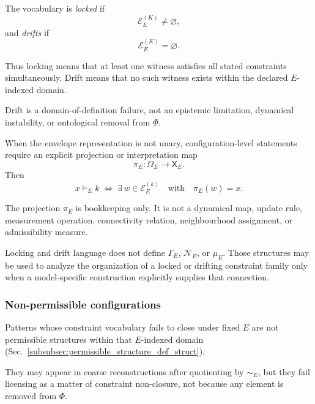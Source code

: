 \documentclass[aps,prx,onecolumn,11pt]{revtex4-2}
\theoremstyle{plain}
\theoremstyle{definition}
\theoremstyle{remark}
\begin{document}
The vocabulary is \emph{locked} if
\begin{equation}
\mathcal{E}^{(K)}_E
\neq
\varnothing,
\label{eq:locking_closure_nonempty}
\end{equation}
and \emph{drifts} if
\begin{equation}
\mathcal{E}^{(K)}_E
=
\varnothing.
\label{eq:drift_nonclosure_empty}
\end{equation}

Thus locking means that at least one witness satisfies all stated
constraints simultaneously. Drift means that no such witness exists
within the declared \(E\)-indexed domain.

Drift is a domain-of-definition failure, not an epistemic limitation,
dynamical instability, or ontological removal from \(\Phi\).

When the envelope representation is not unary, configuration-level
statements require an explicit projection or interpretation map
\[
\pi_E:\Omega_E\to\mathsf{X}_E.
\]
Then
\begin{equation}
x\models_E k
\;\Longleftrightarrow\;
\exists\,w\in\mathcal{E}^{(k)}_E
\quad
\text{with}
\quad
\pi_E(w)=x.
\label{eq:witness_projection_general_to_target}
\end{equation}

The projection \(\pi_E\) is bookkeeping only. It is not a dynamical map,
update rule, measurement operation, connectivity relation, neighbourhood
assignment, or admissibility measure.

Locking and drift language does not define \(\Gamma_E\),
\(\mathcal N_E\), or \(\mu_E\). Those structures may be used to analyze
the organization of a locked or drifting constraint family only when a
model-specific construction explicitly supplies that connection.

\subsubsection{Non-permissible configurations}
\label{subsubsec:nonpermissible_configurations_phase_struct}

Patterns whose constraint vocabulary fails to close under fixed \(E\)
are not permissible structures within that \(E\)-indexed domain
(Sec.~\ref{subsubsec:permissible_structure_def_struct}).

They may appear in coarse reconstructions after quotienting by
\(\sim_E\), but they fail licensing as a matter of constraint
non-closure, not because any element is removed from \(\Phi\).
\end{document}
